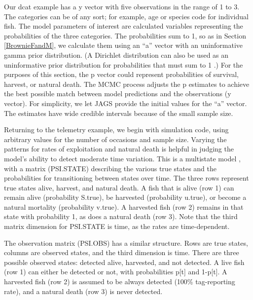 \documentclass[
]{krantz}
\begin{document}
Our dcat example has a y vector with five observations in the range of 1 to 3. The categories can be of any sort; for example, age or species code for individual fish. The model parameters of interest are calculated variables representing the probabilities of the three categories. The probabilities sum to 1, so as in Section \ref{BrownieFandM}, we calculate them using an ``a'' vector with an uninformative gamma prior distribution. (A Dirichlet distribution can also be used as an uninformative prior distribution for probabilities that must sum to 1 \citep{mccarthy_2007}.) For the purposes of this section, the p vector could represent probabilities of survival, harvest, or natural death. The MCMC process adjusts the p estimates to achieve the best possible match between model predictions and the observations (y vector). For simplicity, we let JAGS provide the initial values for the ``a'' vector. The estimates have wide credible intervals because of the small sample size.

Returning to the telemetry example, we begin with simulation code, using arbitrary values for the number of occasions and sample size. Varying the patterns for rates of exploitation and natural death is helpful in judging the model's ability to detect moderate time variation. This is a multistate model \citep{kéry.schaub_2012}, with a matrix (PSI.STATE) describing the various true states and the probabilities for transitioning between states over time. The three rows represent true states alive, harvest, and natural death. A fish that is alive (row 1) can remain alive (probability S.true), be harvested (probability u.true), or become a natural mortality (probability v.true). A harvested fish (row 2) remains in that state with probability 1, as does a natural death (row 3). Note that the third matrix dimension for PSI.STATE is time, as the rates are time-dependent.

The observation matrix (PSI.OBS) has a similar structure. Rows are true states, columns are observed states, and the third dimension is time. There are three possible observed states: detected alive, harvested, and not detected. A live fish (row 1) can either be detected or not, with probabilities p{[}t{]} and 1-p{[}t{]}. A harvested fish (row 2) is assumed to be always detected (100\% tag-reporting rate), and a natural death (row 3) is never detected.
\end{document}
